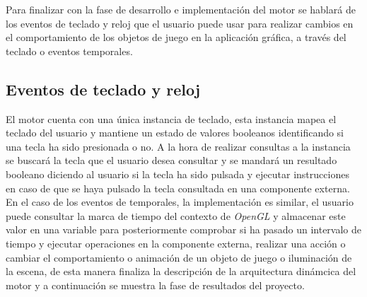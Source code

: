 \documentclass[a4paper]{book}
\begin{document}
Para finalizar con la fase de desarrollo e implementación del motor se hablará de los eventos de
teclado y reloj que el usuario puede usar para realizar cambios en el comportamiento de los objetos de juego en la aplicación gráfica, 
a través del teclado o eventos temporales.

\subsection{Eventos de teclado y reloj}
\label{subsec:eventos}

El motor cuenta con una única instancia de teclado, esta instancia mapea el teclado del usuario y mantiene un estado de valores
booleanos identificando si una tecla ha sido presionada o no. A la hora de realizar consultas a la instancia se buscará la tecla
que el usuario desea consultar y se mandará un resultado booleano diciendo al usuario si la tecla ha sido pulsada y ejecutar
instrucciones en caso de que se haya pulsado la tecla consultada en una componente externa. En el caso de los eventos de temporales,
la implementación es similar, el usuario puede consultar la marca de tiempo del contexto de \textit{OpenGL} y almacenar este valor
en una variable para posteriormente comprobar si ha pasado un intervalo de tiempo y ejecutar operaciones en la componente externa,
realizar una acción o cambiar el comportamiento o animación de un objeto de juego o iluminación de la escena, de esta manera finaliza 
la descripción de la arquitectura dinámcica del motor y a continuación se muestra la fase de resultados del proyecto.
\end{document}
